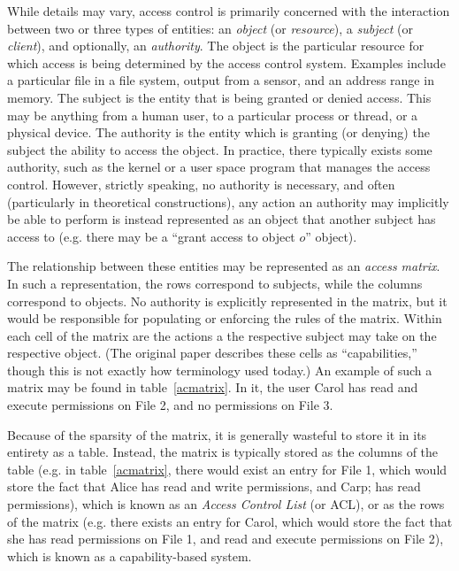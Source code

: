 While details may vary, access control is primarily concerned with the interaction between two or three types of entities: an {\em object} (or {\em resource}), a {\em subject} (or {\em client}), and optionally, an {\em authority}. The object is the particular resource for which access is being determined by the access control system. Examples include a particular file in a file system, output from a sensor, and an address range in memory. The subject is the entity that is being granted or denied access. This may be anything from a human user, to a particular process or thread, or a physical device. The authority is the entity which is granting (or denying) the subject the ability to access the object. In practice, there typically exists some authority, such as the kernel or a user space program that manages the access control. However, strictly speaking, no authority is necessary, and often (particularly in theoretical constructions), any action an authority may implicitly be able to perform is instead represented as an object that another subject has access to (e.g. there may be a ``grant access to object $o$'' object).

The relationship between these entities may be represented as an {\em access matrix}.\cite{lampson1971} In such a representation, the rows correspond to subjects, while the columns correspond to objects. No authority is explicitly represented in the matrix, but it would be responsible for populating or enforcing the rules of the matrix. Within each cell of the matrix are the actions a the respective subject may take on the respective object. (The original paper describes these cells as ``capabilities,'' though this is not exactly how terminology used today.) An example of such a matrix may be found in table~\ref{acmatrix}. In it, the user Carol has read and execute permissions on File 2, and no permissions on File 3. 

Because of the sparsity of the matrix, it is generally wasteful to store it in its entirety as a table. Instead, the matrix is typically stored as the columns of the table (e.g. in table~\ref{acmatrix}, there would exist an entry for File 1, which would store the fact that Alice has read and write permissions, and Carp; has read permissions), which is known as an {\em Access Control List} (or ACL), or as the rows of the matrix (e.g. there exists an entry for Carol, which would store the fact that she has read permissions on File 1, and read and execute permissions on File 2), which is known as a capability-based system.

